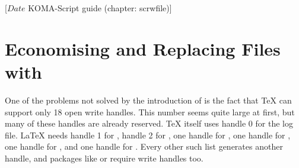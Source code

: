 %
%
%
%
%
%
%
%
% 
%
%
%
%

%
                 [$Date$
                  KOMA-Script guide (chapter: scrwfile)]



\chapter{Economising and Replacing Files with }
\BeginIndexGroup
{}

One of the problems not solved by the introduction of \eTeX{} is the fact that
\TeX{} can support only 18 open write handles. This number seems quite large
at first, but many of these handles are already reserved. \TeX{} itself uses
handle 0 for the log file. \LaTeX{} needs handle 1 for ,
handle 2 for , one handle for , one
handle for , one handle for , and one
handle for . Every other such list generates another handle,
and packages like  or  require write
handles too.

